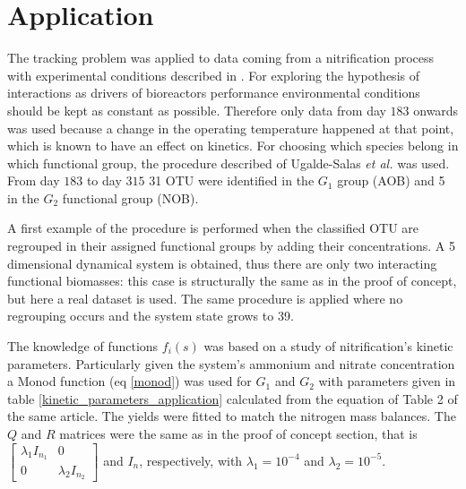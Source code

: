 \documentclass[3p,times]{article}
\begin{document}

\clearpage
\section{Application}
 

The tracking problem was applied to data coming from a nitrification process with experimental conditions described in \cite{dumont2008observers}. For exploring the hypothesis of interactions as drivers of bioreactors performance environmental conditions should be kept as constant as possible. Therefore only data from day $183$ onwards was used because a change in the operating temperature happened at that point, which is known to have an effect on kinetics. For choosing which species belong in which functional group, the procedure described of Ugalde-Salas \textit{et al.} \cite{Ugalde-Salas2019} was used. From day $183$ to day $315$ 31 OTU were identified in the $G_1$ group (AOB) and 5 in the $G_2$ functional group (NOB). 

A first example of the procedure is performed when the classified OTU are regrouped in their assigned functional groups by adding their concentrations. A 5 dimensional dynamical system is obtained, thus there are only two interacting functional biomasses: this case is structurally the same as in the proof of concept, but here a real dataset is used. The same procedure is applied where no regrouping occurs and the system state grows to 39. 

The knowledge of functions $f_i(s)$ was based on a study of nitrification's kinetic parameters\cite{Wiesmann1994}. Particularly given the system's ammonium and nitrate concentration a Monod function (eq \eqref{monod}) was used for $G_1$ and $G_2$ with parameters given in table \ref{kinetic_parameters_application} calculated from the equation of Table 2 of the same article. The yields were fitted to match the nitrogen mass balances. The $Q$ and $R$ matrices were the same as in the proof of concept section, that is $\begin{bmatrix}
\lambda_1 I_{n_1} &0  \\ 0& \lambda_2 I_{n_2}
\end{bmatrix}$ and $I_n$, respectively, with $\lambda_1 = 10^{-4}$ and $\lambda_2 = 10^{-5}$.
\end{document}
